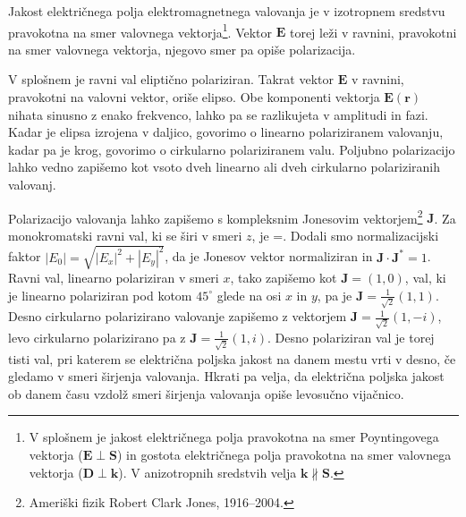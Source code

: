 Jakost električnega polja elektromagnetnega valovanja je v izotropnem
sredstvu pravokotna na smer valovnega vektorja\footnote{V splošnem je
jakost električnega polja pravokotna na smer Poyntingovega vektorja ($\mathbf{E}\perp\mathbf{S}$) in 
gostota električnega polja pravokotna na smer valovnega vektorja ($\mathbf{D}\perp\mathbf{k}$). 
V anizotropnih sredstvih velja $\mathbf k\nparallel\mathbf S$.}. Vektor $\mathbf{E}$
torej leži v ravnini, pravokotni na smer valovnega vektorja, njegovo
smer pa opiše polarizacija. 

V splošnem je ravni val eliptično polariziran. Takrat vektor $\mathbf E$
v ravnini, pravokotni na valovni vektor, oriše elipso. Obe komponenti vektorja 
$\mathbf{E}(\mathbf{r})$ nihata sinusno z enako frekvenco, lahko pa se razlikujeta
v amplitudi in fazi. Kadar je elipsa izrojena v daljico, govorimo o linearno polariziranem valovanju,
kadar pa je krog, govorimo o cirkularno polariziranem valu. Poljubno polarizacijo
lahko vedno zapišemo kot vsoto dveh linearno ali dveh cirkularno polariziranih
valovanj. 

Polarizacijo valovanja lahko zapišemo s kompleksnim Jonesovim 
vektorjem\footnote{Ameriški fizik Robert Clark Jones, 1916--2004.}
$\mathbf{J}$. Za monokromatski ravni val, ki se širi v smeri $z$, je 
\beq
{}=\left[\begin{array}{c}
E_{x}\\
E_{y}
\end{array}\right].
\eeq
Dodali smo normalizacijski faktor $|E_{0}|=\sqrt{|E_{x}|^{2}+|E_{y}|^{2}}$,
da je Jonesov vektor normaliziran in $\mathbf{J}\cdot\mathbf{J}^{*}=1$.
Ravni val, linearno polariziran v smeri $x$, tako zapišemo kot $\mathbf{J}=\left(1,0\right)$,
val, ki je linearno polariziran pod kotom $45^{\circ}$ glede na osi
$x$ in $y$, pa je $\mathbf{J}=\frac{1}{\sqrt{2}}\left(1,1\right)$.
Desno cirkularno polarizirano valovanje zapišemo z vektorjem 
$\mathbf{J}=\frac{1}{\sqrt{2}}\left(1,-i\right)$,
levo cirkularno polarizirano pa z $\mathbf{J}=\frac{1}{\sqrt{2}}\left(1,i\right)$.
Desno polariziran val je torej tisti val, pri katerem se električna
poljska jakost na danem mestu vrti v desno, če gledamo v smeri širjenja
valovanja. Hkrati pa velja, da električna poljska jakost ob danem
času vzdolž smeri širjenja valovanja opiše levosučno vijačnico. 

